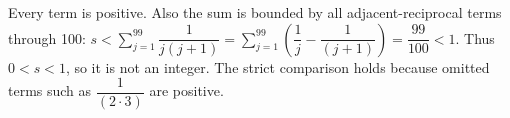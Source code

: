 Every term is positive. Also the sum is bounded by all adjacent-reciprocal terms through 100: $s<\sum_{j=1}^{99}\dfrac{1}{j(j+1)}=\sum_{j=1}^{99}(\dfrac{1}{j}-\dfrac{1}{(j+1)})=\dfrac{99}{100}<1$. Thus $0<s<1$, so it is not an integer. The strict comparison holds because omitted terms such as $\dfrac{1}{(2\cdot3)}$ are positive.
